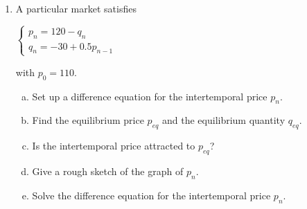 \documentclass[11pt]{exam}
\begin{document}
\begin{enumerate}
\item A particular market satisfies
\begin{center}
$\begin{cases}p_{n} = 120 - q_{n}\\q_{n} = -30 + 0.5p_{n-1}\end{cases}$
\end{center}
\p with $p_{0} = 110$.
\vsp
\begin{enumerate}[(a)]
\item Set up a difference equation for the intertemporal price $p_{n}$.
\item Find the equilibrium price $p_{eq}$ and the equilibrium quantity $q_{eq}$.
\item Is the intertemporal price attracted to $p_{eq}$?
\item Give a rough sketch of the graph of $p_{n}$.
\item Solve the difference equation for the intertemporal price $p_{n}$.
\end{enumerate}

\end{enumerate}
\end{document}
